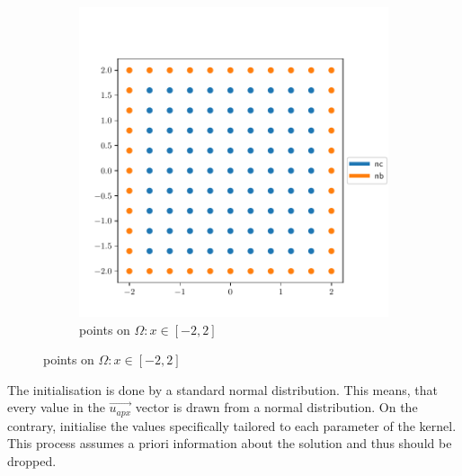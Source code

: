 \documentclass[./\jobname.tex]{subfiles}
\begin{document}
\begin{figure}[h]
\begin{subfigure}[b]{0.5\linewidth}
		\includegraphics[width=1\textwidth]{../img/pdf/testbed_big_domain.pdf}
		\caption{points on $\Omega: x\in [-2,2]$}
		\label{fig:collocation_points_domain_big}
	\end{subfigure}%
	\label{fig:collocation_points}
\end{figure}

The initialisation is done by a standard normal distribution. This means, that every value in the $\vec{u_{apx}}$ vector is drawn from a normal distribution. On the contrary, \cite{chaquet_using_2019} initialise the values specifically tailored to each parameter of the kernel. This process assumes a priori information about the solution and thus should be dropped. 
\end{document}
